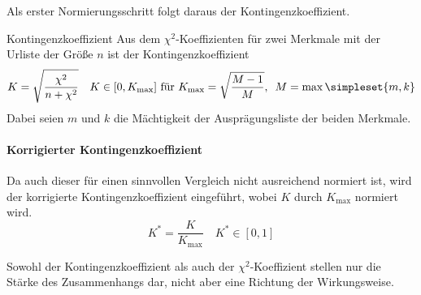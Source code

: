 Als erster Normierungsschritt folgt daraus der Kontingenzkoeffizient.
\begin{definition}{Kontingenzkoeffizient}
	Aus dem $\chi^2$-Koeffizienten für zwei Merkmale mit der Urliste der Größe $n$ ist der Kontingenzkoeffizient
	\begin{equation*}
		K=\sqrt{\frac{\chi^2}{n+\chi^2}} \quad K\in[0, K_{\mathrm{max}}] \text{ für } K_{\mathrm{max}}=\sqrt{\frac{M-1}{M}},\enspace M=\max\simpleset{m,k}
	\end{equation*}
	Dabei seien $m$ und $k$ die Mächtigkeit der Ausprägungsliste der beiden Merkmale.
\end{definition}

\paragraph{Korrigierter Kontingenzkoeffizient}
Da auch dieser für einen sinnvollen Vergleich nicht ausreichend normiert ist, wird der korrigierte Kontingenzkoeffizient eingeführt, wobei $K$ durch $K_{\mathrm{max}}$ normiert wird.
\begin{equation*}
	K^\ast = \frac{K}{K_{\mathrm{max}}}\quad K^\ast \in [0,1]
\end{equation*}

Sowohl der Kontingenzkoeffizient als auch der $\chi^2$-Koeffizient stellen nur die Stärke des Zusammenhangs dar, nicht aber eine Richtung der Wirkungsweise. 
